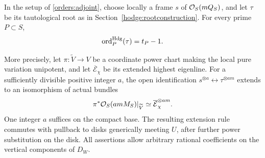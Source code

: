 \begin{theorem}
\label{orders:trace}
In the setup of \eqref{orders:adjoint}, choose locally a frame
\(s\) of \(\mathcal O_S(mQ_S)\), and let \(\tau\) be its tautological
root as in Section~\ref{hodge:rootconstruction}.  For every prime
\(P\subset S\),
\begin{equation}
                   \operatorname{ord}_P^{\mathrm{Hdg}}(\tau)=t_P-1.
 \label{orders:traceorder}
\end{equation}

More precisely, let \(\pi:\widetilde V\to V\) be a coordinate
power chart making the local pure variation unipotent, and let
\(\overline{\mathcal E}_\chi\) be its extended highest eigenline.
For a sufficiently divisible positive integer \(a\), the open
identification \(s^{\otimes a}\leftrightarrow
\tau^{\otimes am}\) extends to an isomorphism of actual bundles
\begin{equation}
 \pi^*\mathcal O_S(amM_S)|_{\widetilde V}
       \simeq \overline{\mathcal E}_\chi^{\otimes am}.
 \label{orders:tracebundle}
\end{equation}
One integer \(a\) suffices on the compact base.  The resulting
extension rule commutes with pullback to disks generically
meeting \(U\), after further power substitution on the disk.
All assertions allow arbitrary rational coefficients on the
vertical components of \(D_W\).
\end{theorem}

